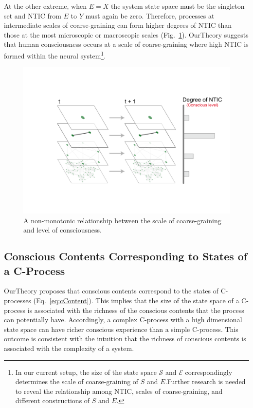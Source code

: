 \documentclass[utf8]{article}
\begin{document}
    		At the other extreme, when $E=X$ the system state space must be the singleton set and NTIC from $E$ to $Y$ must again be zero. Therefore, processes at intermediate scales of coarse-graining can form higher degrees of NTIC than those at the most microscopic or macroscopic scales (Fig.~\ref{fig:LevelOfConsciousness}). \ac{OurTheory} suggests that human consciousness occurs at a scale of coarse-graining where high NTIC is formed within the neural system\footnote{In our current setup, the size of the state space $\mathcal{S}$ and $\mathcal{E}$ correspondingly determines the scale of coarse-graining of $S$ and $E$.Further research is needed to reveal the relationship among NTIC, scales of coarse-graining, and different constructions of $S$ and $E$.}. 
    		
    		\begin{figure}[H]				
        		\includegraphics[width=\textwidth]{Submission/Frontiers/nonMono.pdf}
        		\caption{A non-monotonic relationship between the scale of coarse-graining and level of consciousness.}
        		\label{fig:LevelOfConsciousness}
    		\end{figure}
            
    			
		\subsection{Conscious Contents Corresponding to States of a C-Process}\label{sec:cc}
    		\ac{OurTheory} proposes that conscious contents correspond to the states of C-processes (Eq.~\ref{eq:cContent}). This implies that the size of the state space of a C-process is associated with the richness of the conscious contents that the process can potentially have. Accordingly, a complex C-process with a high dimensional state space can have richer conscious experience than a simple C-process. This outcome is consistent with the intuition that the richness of conscious contents is associated with the complexity of a system. 
    		
\end{document}
